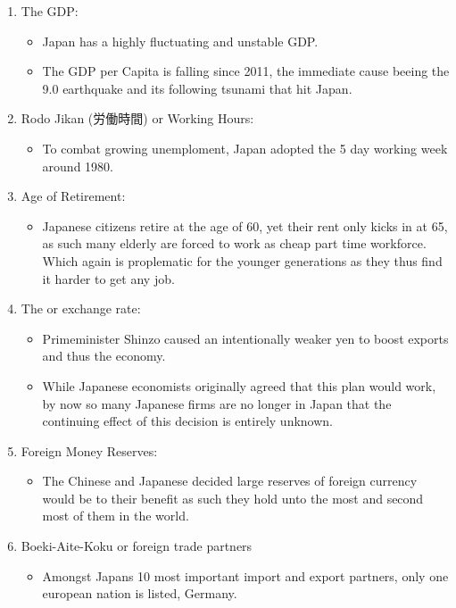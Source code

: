 \documentclass{article}
\newcommand\tabi[1][0.05cm]{\hspace*{#1}}
\begin{document}
\begin{enumerate}
\item The GDP:
\begin{itemize}
\item Japan has a highly fluctuating and unstable GDP.
\item The GDP per Capita is falling since 2011, the immediate cause beeing the 9.0 earthquake and its following tsunami that hit Japan.
\end{itemize}
\item Rodo Jikan (労働時間) or Working Hours:
\begin{itemize}
\item To combat growing unemploment, Japan adopted the 5 day working week around 1980.
\end{itemize}
\item Age of Retirement:
\begin{itemize}
\item Japanese citizens retire at the age of 60, yet their rent only kicks in at 65, as such many elderly are forced to work as cheap part time workforce. Which again is proplematic for the younger generations as they thus find it harder to get any job.
\end{itemize}
\item The  \tabi or exchange rate:
\begin{itemize}
\item Primeminister Shinzo caused an intentionally weaker yen to boost exports and thus the economy.
\item While Japanese economists originally agreed that this plan would work, by now so many Japanese firms are no longer in Japan that the continuing effect of this decision is entirely unknown.
\end{itemize}
\item Foreign Money Reserves:
\begin{itemize}
\item The Chinese and Japanese decided large reserves of foreign currency would be to their benefit as such they hold unto the most and second most of them in the world.
\end{itemize}
\item Boeki-Aite-Koku or foreign trade partners
\begin{itemize}
\item Amongst Japans 10 most important import and export partners, only one european nation is listed, Germany.
\end{itemize}
\end{enumerate}
\end{document}

